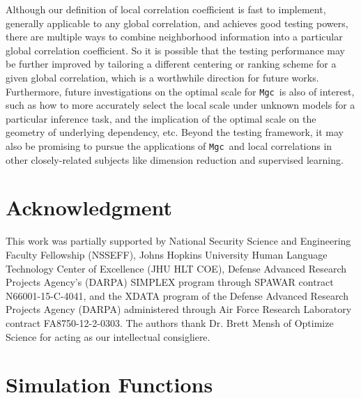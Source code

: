 \documentclass[11pt]{article}
\newcommand{\note}[2][]{\added[#1,remark={#2}]{}}
\providecommand{\sct}[1]{{\sc \texttt{#1}}}
\newcommand{\Mgc}{\sct{Mgc}}
\newcommand{\cs}[1]{{\note{cs: #1}}}
\begin{document}
Although our definition of local correlation coefficient is fast to implement, generally applicable to any global correlation, and achieves good testing powers, there are multiple ways to combine neighborhood information into a particular global correlation coefficient. So it is possible that the testing performance may be further improved by tailoring a different centering or ranking scheme for a given global correlation, which is a worthwhile direction for future works. Furthermore, future investigations on the optimal scale for \Mgc~is also of interest, such as how to more accurately select the local scale under unknown models for a particular inference task, and the implication of the optimal scale on the geometry of underlying dependency, etc. Beyond the testing framework, it may also be promising to pursue the applications of \Mgc~and local correlations in other closely-related subjects like dimension reduction and supervised learning. \cs{choosing the metric, using the concept for other testing and prediction domains, eg, using the scales for guidance in constructing prediction engines.}


\section*{Acknowledgment}
This work was partially supported by 
% 
National Security Science and Engineering Faculty Fellowship (NSSEFF), 
% 
Johns Hopkins University Human Language Technology Center of Excellence (JHU HLT COE), 
% 
Defense Advanced Research Projects Agency's (DARPA) SIMPLEX program through SPAWAR contract N66001-15-C-4041, 
% 
and the XDATA program of the Defense Advanced Research Projects Agency (DARPA) administered through Air Force Research Laboratory contract FA8750-12-2-0303. The authors thank Dr. Brett Mensh of Optimize Science for acting as our intellectual consigliere.



\appendix
\setcounter{figure}{0}
\renewcommand\thefigure{A\arabic{figure}} 

\section{Simulation Functions}
\label{appen:function}
\end{document}
